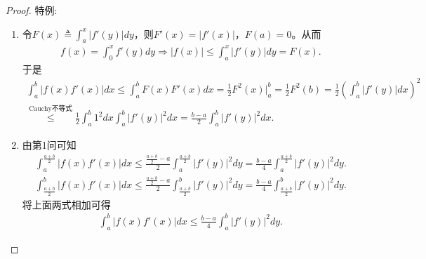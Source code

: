 \documentclass[../../main.tex]{subfiles}
\begin{document}
\begin{proof}
{\heiti 特例:}
\begin{enumerate}
\item 令\(F(x) \triangleq \int_{a}^{x}|f'(y)|dy\)，则\(F'(x) = |f'(x)|\)，\(F(a) = 0\)。从而
\begin{align*}
f(x) = \int_{0}^{x}f'(y)dy \Rightarrow |f(x)| \leqslant \int_{a}^{x}|f'(y)|dy = F(x).
\end{align*}
于是
\begin{align*}
\int_{a}^{b}|f(x)f'(x)|dx \leqslant \int_{a}^{b}F(x)F'(x)dx = \frac{1}{2}F^2(x)\big|_{a}^{b} = \frac{1}{2}F^2(b) = \frac{1}{2}\left( \int_{a}^{b}|f'(y)|dx \right)^2 \\
\overset{\text{Cauchy不等式}}{\leqslant} \frac{1}{2}\int_{a}^{b}1^2dx \int_{a}^{b}|f'(y)|^2dx = \frac{b - a}{2}\int_{a}^{b}|f'(y)|^2dx.
\end{align*}

\item 由第1问可知
\begin{align*}
\int_{a}^{\frac{a + b}{2}}|f(x)f'(x)|dx \leqslant \frac{\frac{a + b}{2} - a}{2}\int_{a}^{\frac{a + b}{2}}|f'(y)|^2dy = \frac{b - a}{4}\int_{a}^{\frac{a + b}{2}}|f'(y)|^2dy.
\end{align*}
\begin{align*}
\int_{\frac{a + b}{2}}^{b}|f(x)f'(x)|dx \leqslant \frac{\frac{a + b}{2} - a}{2}\int_{\frac{a + b}{2}}^{b}|f'(y)|^2dy = \frac{b - a}{4}\int_{\frac{a + b}{2}}^{b}|f'(y)|^2dy.
\end{align*}
将上面两式相加可得
\begin{align*}
\int_{a}^{b}|f(x)f'(x)|dx \leqslant \frac{b - a}{4}\int_{a}^{b}|f'(y)|^2dy.
\end{align*}
\end{enumerate}


\end{proof}
\end{document}
